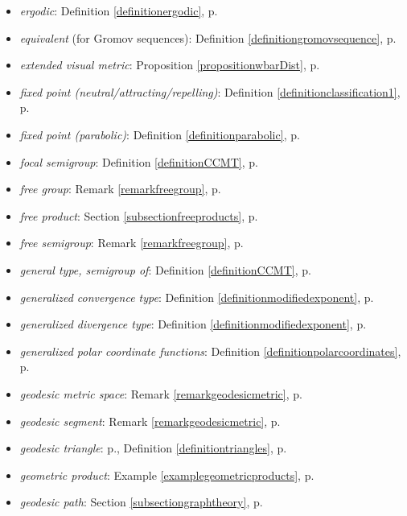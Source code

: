 \begin{itemize}
\item\emph{ergodic}: Definition \ref{definitionergodic}, p.\pageref{definitionergodic}
\item\emph{equivalent} (for Gromov sequences): Definition \ref{definitiongromovsequence}, p.\pageref{definitiongromovsequence}
\item\emph{extended visual metric}: Proposition \ref{propositionwbarDist}, p.\pageref{propositionwbarDist}
\item\emph{fixed point (neutral/attracting/repelling)}: Definition \ref{definitionclassification1}, p.\pageref{definitionclassification1}
\item\emph{fixed point (parabolic)}: Definition \ref{definitionparabolic}, p.\pageref{definitionparabolic}
\item\emph{focal semigroup}: Definition \ref{definitionCCMT}, p.\pageref{definitionCCMT}
\item\emph{free group}: Remark \ref{remarkfreegroup}, p.\pageref{remarkfreegroup}
\item\emph{free product}: Section \ref{subsectionfreeproducts}, p.\pageref{subsectionfreeproducts}
\item\emph{free semigroup}: Remark \ref{remarkfreegroup}, p.\pageref{remarkfreegroup}
\item\emph{general type, semigroup of}: Definition \ref{definitionCCMT}, p.\pageref{definitionCCMT}
\item\emph{generalized convergence type}: Definition \ref{definitionmodifiedexponent}, p.\pageref{definitionmodifiedexponent}
\item\emph{generalized divergence type}: Definition \ref{definitionmodifiedexponent}, p.\pageref{definitionmodifiedexponent}
\item\emph{generalized polar coordinate functions}: Definition \ref{definitionpolarcoordinates}, p.\pageref{definitionpolarcoordinates}
\item\emph{geodesic metric space}: Remark \ref{remarkgeodesicmetric}, p.\pageref{remarkgeodesicmetric}
\item\emph{geodesic segment}: Remark \ref{remarkgeodesicmetric}, p.\pageref{remarkgeodesicmetric}
\item\emph{geodesic triangle}: p.\pageref{subsectionCAT}, Definition \ref{definitiontriangles}, p.\pageref{definitiontriangles}
\item\emph{geometric product}: Example \ref{examplegeometricproducts}, p.\pageref{examplegeometricproducts}
\item\emph{geodesic path}: Section \ref{subsectiongraphtheory}, p.\pageref{subsectiongraphtheory}

\end{itemize}
